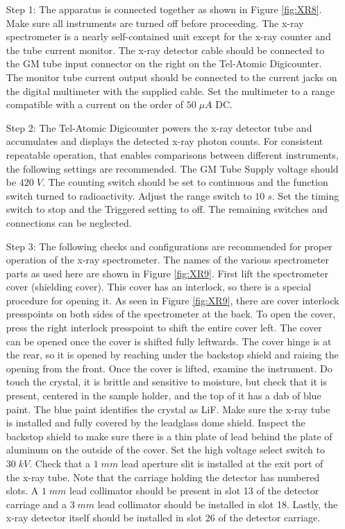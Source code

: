 \begin{itemize}[leftmargin = 50pt]
    \item[Step 1:] The apparatus is connected together as shown in Figure \ref{fig:XR8}. Make sure all instruments are turned off before proceeding. The x-ray spectrometer is a nearly self-contained unit except for the x-ray counter and the tube current monitor. The x-ray detector cable should be connected to the GM tube input connector on the right on the Tel-Atomic Digicounter. The monitor tube current output should be connected to the current jacks on the digital multimeter with the supplied cable. Set the multimeter to a range compatible with a current on the order of $50 \;\mu A$ DC.
    \item[Step 2:] The Tel-Atomic Digicounter powers the x-ray detector tube and accumulates and displays the detected x-ray photon counts. For consistent repeatable operation, that enables comparisons between different instruments, the following settings are recommended. The GM Tube Supply voltage should be $420\; V$. The counting switch should be set to continuous and the function switch turned to radioactivity. Adjust the range switch to $10\;s$. Set the timing switch to stop and the Triggered setting to off. The remaining switches and connections can be neglected.
    \item[Step 3:] The following checks and configurations are recommended for proper operation of the x-ray spectrometer. The names of the various spectrometer parts as used here are shown in Figure \ref{fig:XR9}. First lift the spectrometer cover (shielding cover). This cover has an interlock, so there is a special procedure for opening it. As seen in Figure \ref{fig:XR9}, there are cover interlock presspoints on both sides of the spectrometer at the back. To open the cover, press the right interlock presspoint to shift the entire cover left. The cover can be opened once the cover is shifted fully leftwards. The cover hinge is at the rear, so it is opened by reaching under the backstop shield and raising the opening from the front. Once the cover is lifted, examine the instrument. Do  touch the crystal, it is brittle and sensitive to moisture, but check that it is present, centered in the sample holder, and the top of it has a dab of blue paint. The blue paint identifies the crystal as LiF. Make sure the x-ray tube is installed and fully covered by the leadglass dome shield. Inspect the backstop shield to make sure there is a thin plate of lead behind the plate of aluminum on the outside of the cover. Set the high voltage select switch to $30 \;kV$. Check that a $1\;mm$ lead aperture slit is installed at the exit port of the x-ray tube. Note that the carriage holding the detector has numbered slots. A $1 \;mm$ lead collimator should be present in slot 13 of the detector carriage and a $3\;mm$ lead collimator should be installed in slot 18. Lastly, the x-ray detector itself should be installed in slot 26 of the detector carriage.

\end{itemize}
